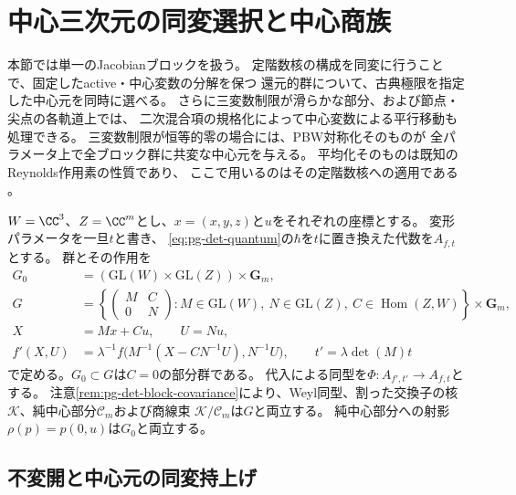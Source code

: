 \section{中心三次元の同変選択と中心商族}
\label{sec:pg-equivariant-central-lifts}
本節では単一のJacobianブロックを扱う。
定階数核の構成を同変に行うことで、固定したactive・中心変数の分解を保つ
還元的群について、古典極限を指定した中心元を同時に選べる。
さらに三変数制限が滑らかな部分、および節点・尖点の各軌道上では、
二次混合項の規格化によって中心変数による平行移動も処理できる。
三変数制限が恒等的零の場合には、PBW対称化そのものが
全パラメータ上で全ブロック群に共変な中心元を与える。
平均化そのものは既知のReynolds作用素の性質であり、
ここで用いるのはその定階数核への適用である
\cite[\S2, p.~369]{PDerksenInvariants}。

$W=\CC^3$、$Z=\CC^m$とし、$x=(x,y,z)$と$u$をそれぞれの座標とする。
変形パラメータを一旦$t$と書き、
\eqref{eq:pg-det-quantum}の$\hbar$を$t$に置き換えた代数を$A_{f,t}$とする。
群とその作用を
\begin{equation}
 \begin{aligned}
 G_0&=(\mathrm{GL}(W)\times\mathrm{GL}(Z))\times\mathbf G_m,\\
 G&=\left\{
 \begin{pmatrix}M&C\\0&N\end{pmatrix}
 :M\in\mathrm{GL}(W),\ N\in\mathrm{GL}(Z),\ C\in\operatorname{Hom}(Z,W)
 \right\}\times\mathbf G_m,\\
 X&=Mx+Cu,\qquad U=Nu,\\
 f'(X,U)&=\lambda^{-1}
 f\bigl(M^{-1}(X-CN^{-1}U),N^{-1}U\bigr),\qquad
 t'=\lambda\det(M)t
 \end{aligned}
 \label{eq:pg-equivariant-groups}
\end{equation}
で定める。$G_0\subset G$は$C=0$の部分群である。
代入による同型を$\Phi:A_{f',t'}\to A_{f,t}$とする。
注意\ref{rem:pg-det-block-covariance}により、Weyl同型、割った交換子の核
$\mathcal K$、純中心部分$\mathcal C_m$および商線束
$\mathcal K/\mathcal C_m$は$G$と両立する。
純中心部分への射影$\rho(p)=p(0,u)$は$G_0$と両立する。

\subsection{不変開と中心元の同変持上げ}

